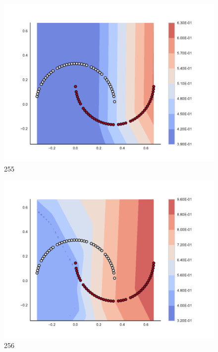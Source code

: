 \begin{subfigure}[b]{0.09\textwidth}
    \includegraphics[clip, trim=2.35cm 1.75cm 4.5cm 0cm,width=\textwidth]{img/convergence/255.pdf}
    \caption{255}
    \label{fig:convergence_255}
\end{subfigure}
%
\begin{subfigure}[b]{0.09\textwidth}
    \includegraphics[clip, trim=2.35cm 1.75cm 4.5cm 0cm,width=\textwidth]{img/convergence/256.pdf}
    \caption{256}
    \label{fig:convergence_256}
\end{subfigure}
%
